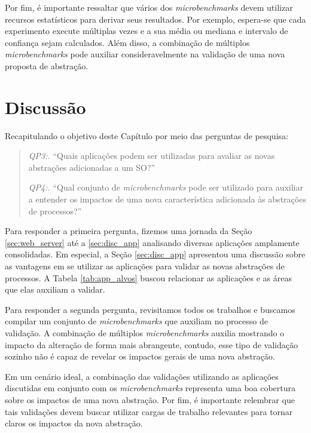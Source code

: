Por fim, é importante ressaltar que vários dos \emph{microbenchmarks} devem
utilizar recursos estatísticos para derivar seus resultados. Por exemplo,
espera-se que cada experimento execute múltiplas vezes e a sua média ou mediana
e intervalo de confiança sejam calculados. Além disso, a combinação de
múltiplos \emph{microbenchmarks} pode auxiliar consideravelmente na validação
de uma nova proposta de abstração.

\section{Discussão}

Recapitulando o objetivo deste Capítulo por meio das perguntas de pesquisa:

\begin{quote}
  \item \emph{QP3:.} ``Quais aplicações podem ser utilizadas para avaliar as novas abstrações adicionadas a um SO?''
  \item \emph{QP4:.} ``Qual conjunto de \emph{microbenchmarks} pode ser utilizado para auxiliar a entender os impactos de uma nova característica adicionada às abstrações de processos?''
\end{quote}

Para responder a primeira pergunta, fizemos uma jornada da Seção
\ref{sec:web_server} até a \ref{sec:disc_app} analisando diversas aplicações
amplamente consolidadas. Em especial, a Seção \ref{sec:disc_app} apresentou uma
discussão sobre as vantagens em se utilizar as aplicações para validar as novas
abstrações de processos. A Tabela \ref{tab:app_alvos} buscou relacionar as
aplicações e as áreas que elas auxiliam a validar.

Para responder a segunda pergunta, revisitamos todos os trabalhos e buscamos
compilar um conjunto de \emph{microbenchmarks} que auxiliam no processo de
validação. A combinação de múltiplos \emph{microbenchmarks} auxilia
mostrando o impacto da alteração de forma mais abrangente, contudo, esse tipo
de validação sozinho não é capaz de revelar os impactos gerais de uma nova
abstração.

Em um cenário ideal, a combinação das validações utilizando as aplicações
discutidas em conjunto com os \emph{microbenchmarks} representa uma boa
cobertura sobre os impactos de uma nova abstração. Por fim, é importante
relembrar que tais validações devem buscar utilizar cargas de trabalho
relevantes para tornar claros os impactos da nova abstração.
